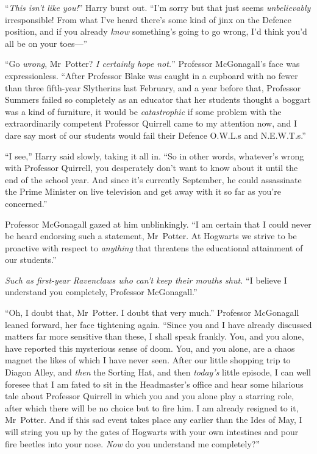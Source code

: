 “\emph{This isn’t like you!}” Harry burst out.
“I’m sorry but that just seems \emph{unbelievably} irresponsible! From what I’ve heard there’s some kind of jinx on the Defence position, and if you already \emph{know} something’s going to go wrong, I’d think you’d all be on your toes—”

“Go \emph{wrong}, Mr~Potter? \emph{I certainly hope not.}” Professor McGonagall’s face was expressionless.
“After Professor Blake was caught in a cupboard with no fewer than three fifth-year Slytherins last February, and a year before that, Professor Summers failed so completely as an educator that her students thought a boggart was a kind of furniture, it would be \emph{catastrophic} if some problem with the extraordinarily competent Professor Quirrell came to my attention now, and I dare say most of our students would fail their Defence O.W.L.s and N.E.W.T.s.”

“I see,” Harry said slowly, taking it all in.
“So in other words, whatever’s wrong with Professor Quirrell, you desperately don’t want to know about it until the end of the school year. And since it’s currently September, he could assassinate the Prime Minister on live television and get away with it so far as you’re concerned.”

Professor McGonagall gazed at him unblinkingly.
“I am certain that I could never be heard endorsing such a statement, Mr~Potter. At Hogwarts we strive to be proactive with respect to \emph{anything} that threatens the educational attainment of our students.”

\emph{Such as first-year Ravenclaws who can’t keep their mouths shut.}
“I believe I understand you completely, Professor McGonagall.”

“Oh, I doubt that, Mr~Potter. I doubt that very much.” Professor McGonagall leaned forward, her face tightening again.
“Since you and I have already discussed matters far more sensitive than these, I shall speak frankly. You, and you alone, have reported this mysterious sense of doom. You, and you alone, are a chaos magnet the likes of which I have never seen. After our little shopping trip to Diagon Alley, and \emph{then} the Sorting Hat, and then \emph{today’s} little episode, I can well foresee that I am fated to sit in the Headmaster’s office and hear some hilarious tale about Professor Quirrell in which you and you alone play a starring role, after which there will be no choice but to fire him. I am already resigned to it, Mr~Potter. And if this sad event takes place any earlier than the Ides of May, I will string you up by the gates of Hogwarts with your own intestines and pour fire beetles into your nose. \emph{Now} do you understand me completely?”


